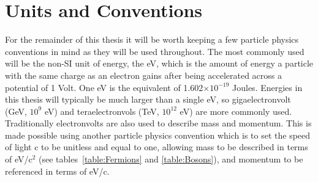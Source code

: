 \section{Units and Conventions}
 
For the remainder of this thesis it will be worth keeping a few particle physics conventions in mind as they will be used throughout.  
The most commonly used will be the non-SI unit of energy, the \gls{eV}, which is the amount of energy a particle with the same charge as an electron gains after being accelerated across a potential of 1 Volt.  
One eV is the equivalent of 1.602$\times 10^{-19}$ Joules.  
Energies in this thesis will typically be much larger than a single eV, so gigaelectronvolt (GeV, $10^9$ eV) and teraelectronvols  (TeV, $10^{12}$ eV) are more commonly used.  
Traditionally electronvolts are also used to describe mass and momentum.  
This is made possible using another particle physics convention which is to set the speed of light c to be unitless and equal to one, allowing mass to be described in terms of eV/c$^2$ (see tables~\ref{table:Fermions} and \ref{table:Bosons}), and momentum to be referenced in terms of eV/c.  


